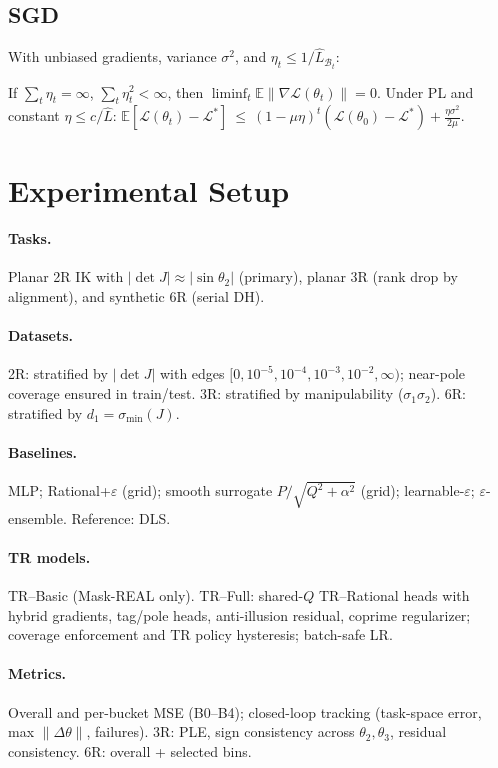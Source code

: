 \documentclass[twoside,11pt]{article}
\begin{document}
\subsection*{SGD} With unbiased gradients, variance $\sigma^2$, and $\eta_t\le 1/\widehat L_{\mathcal{B}_t}$:
\begin{theorem}\label{thm:sgd}
If $\sum_t\eta_t=\infty$, $\sum_t\eta_t^2<\infty$, then $\liminf_t\mathbb{E}\|\nabla\mathcal{L}(\theta_t)\|=0$. Under PL and constant $\eta\le c/\widehat L$:
$\mathbb{E}[\mathcal{L}(\theta_t)-\mathcal{L}^*]\ \le\ (1-\mu\eta)^t(\mathcal{L}(\theta_0)-\mathcal{L}^*) + \tfrac{\eta\sigma^2}{2\mu}$.
\end{theorem}

\section*{Experimental Setup}
\label{sec:exp-setup}
\paragraph{Tasks.} Planar 2R IK with $|\det J|\approx |\sin\theta_2|$ (primary), planar 3R (rank drop by alignment), and synthetic 6R (serial DH).
\paragraph{Datasets.} 2R: stratified by $|\det J|$ with edges $[0,10^{-5},10^{-4},10^{-3},10^{-2},\infty)$; near-pole coverage ensured in train/test. 3R: stratified by manipulability ($\sigma_1\sigma_2$). 6R: stratified by $d_1=\sigma_{\min}(J)$.
\paragraph{Baselines.} MLP; Rational+$\varepsilon$ (grid); smooth surrogate $P/\sqrt{Q^2+\alpha^2}$ (grid); learnable-$\varepsilon$; $\varepsilon$-ensemble. Reference: DLS.
\paragraph{TR models.} TR--Basic (Mask-REAL only). TR--Full: shared-$Q$ TR--Rational heads with hybrid gradients, tag/pole heads, anti-illusion residual, coprime regularizer; coverage enforcement and TR policy hysteresis; batch-safe LR.
\paragraph{Metrics.} Overall and per-bucket MSE (B0--B4); closed-loop tracking (task-space error, max $\|\Delta\theta\|$, failures). 3R: PLE, sign consistency across $\theta_2,\theta_3$, residual consistency. 6R: overall + selected bins.
\end{document}

